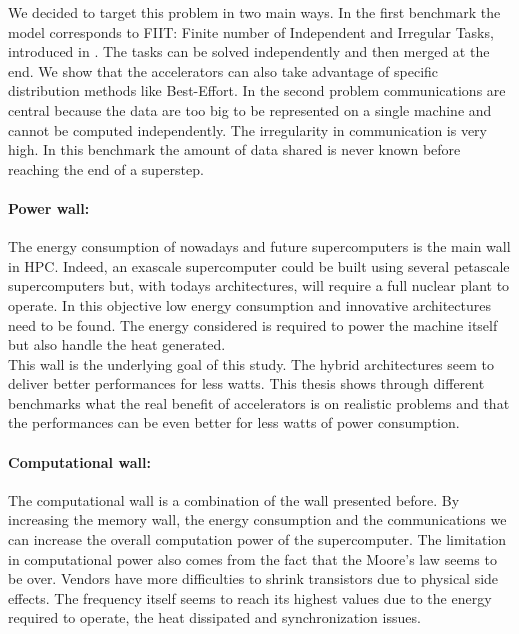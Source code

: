 We decided to target this problem in two main ways. 
In the first benchmark the model corresponds to FIIT: Finite number of Independent and Irregular Tasks, introduced in \cite{flauzac2003confiit}.
The tasks can be solved independently and then merged at the end. 
We show that the accelerators can also take advantage of specific distribution methods like Best-Effort. 
In the second problem communications are central because the data are too big to be represented on a single machine and cannot be computed independently. 
The irregularity in communication is very high.
In this benchmark the amount of data shared is never known before reaching the end of a superstep.

\paragraph{Power wall: }
The energy consumption of nowadays and future supercomputers is the main wall in HPC. 
Indeed, an exascale supercomputer could be built using several petascale supercomputers but, with todays architectures, will require a full nuclear plant to operate. 
In this objective low energy consumption and innovative architectures need to be found. 
The energy considered is required to power the machine itself but also handle the heat generated.\\

This wall is the underlying goal of this study. 
The hybrid architectures seem to deliver better performances for less watts.
This thesis shows through different benchmarks what the real benefit of accelerators is on realistic problems and that the performances can be even better for less watts of power consumption.

\paragraph{Computational wall: }
The computational wall is a combination of the wall presented before. 
By increasing the memory wall, the energy consumption and the communications we can increase the overall computation power of the supercomputer. 
The limitation in computational power also comes from the fact that the Moore's law seems to be over. 
Vendors have more difficulties to shrink transistors due to physical side effects. 
The frequency itself seems to reach its highest values due to the energy required to operate, the heat dissipated and synchronization issues.\\ 

